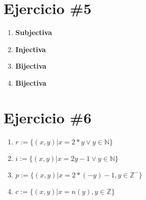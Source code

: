 \documentclass[12pt,letterpaper]{article}
\begin{document}
\section{Ejercicio \#5}
	\begin{enumerate}
		\item{
			 \textbf{Subjectiva}
		}
		\item{
			\textbf{Injectiva}
		}
		\item{
			\textbf{Bijectiva}
		}
		\item{
			\textbf{Bijectiva}
		}
	\end{enumerate}
\section{Ejercicio \#6}
	\begin{enumerate}
		\item {
			$r:= \{(x,y)| x=2*y \lor y \in \mathbb{N}\}$
			}
    	\item {
	    	$i:= \{(x, y)|x = 2y-1 \lor y \in \mathbb{N}\}$
    	}
    	\item {
    		$p:= \{(x,y)|x = 2*(-y)-1, y \in \mathbb{Z}^- \}$
    		}
    	\item {
    		$c:= \{(x,y)|x=n(y),y\in \mathbb{Z} \}$
    	}
	\end{enumerate}
\end{document}
